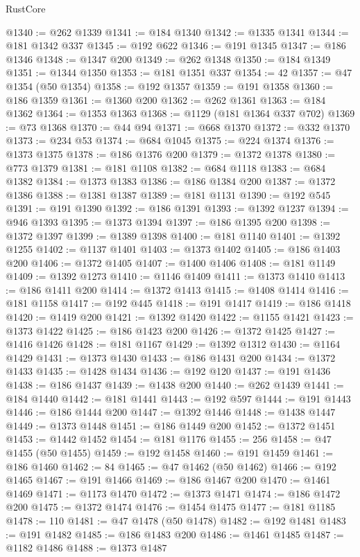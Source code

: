 \begin{lexlean}{RustCore}
\begin{coremodule}
@1340 := @262 @1339
@1341 := @184 @1340
@1342 := @1335 @1341
@1344 := @181 @1342 @337
@1345 := @192 @622
@1346 := @191 @1345
@1347 := @186 @1346
@1348 := @1347 @200
@1349 := @262 @1348
@1350 := @184 @1349
@1351 := @1344 @1350
@1353 := @181 @1351 @337
@1354 := 42
@1357 := @47 @1354 (@50 @1354)
@1358 := @192 @1357
@1359 := @191 @1358
@1360 := @186 @1359
@1361 := @1360 @200
@1362 := @262 @1361
@1363 := @184 @1362
@1364 := @1353 @1363
@1368 := @1129 (@181 @1364 @337 @702)
@1369 := @73 @1368
@1370 := @44 @94
@1371 := @668 @1370
@1372 := @332 @1370
@1373 := @234 @53
@1374 := @684 @1045
@1375 := @224 @1374
@1376 := @1373 @1375
@1378 := @186 @1376 @200
@1379 := @1372 @1378
@1380 := @773 @1379
@1381 := @181 @1108
@1382 := @684 @1118
@1383 := @684 @1382
@1384 := @1373 @1383
@1386 := @186 @1384 @200
@1387 := @1372 @1386
@1388 := @1381 @1387
@1389 := @181 @1131
@1390 := @192 @545
@1391 := @191 @1390
@1392 := @186 @1391
@1393 := @1392 @1237
@1394 := @946 @1393
@1395 := @1373 @1394
@1397 := @186 @1395 @200
@1398 := @1372 @1397
@1399 := @1389 @1398
@1400 := @181 @1140
@1401 := @1392 @1255
@1402 := @1137 @1401
@1403 := @1373 @1402
@1405 := @186 @1403 @200
@1406 := @1372 @1405
@1407 := @1400 @1406
@1408 := @181 @1149
@1409 := @1392 @1273
@1410 := @1146 @1409
@1411 := @1373 @1410
@1413 := @186 @1411 @200
@1414 := @1372 @1413
@1415 := @1408 @1414
@1416 := @181 @1158
@1417 := @192 @445
@1418 := @191 @1417
@1419 := @186 @1418
@1420 := @1419 @200
@1421 := @1392 @1420
@1422 := @1155 @1421
@1423 := @1373 @1422
@1425 := @186 @1423 @200
@1426 := @1372 @1425
@1427 := @1416 @1426
@1428 := @181 @1167
@1429 := @1392 @1312
@1430 := @1164 @1429
@1431 := @1373 @1430
@1433 := @186 @1431 @200
@1434 := @1372 @1433
@1435 := @1428 @1434
@1436 := @192 @120
@1437 := @191 @1436
@1438 := @186 @1437
@1439 := @1438 @200
@1440 := @262 @1439
@1441 := @184 @1440
@1442 := @181 @1441
@1443 := @192 @597
@1444 := @191 @1443
@1446 := @186 @1444 @200
@1447 := @1392 @1446
@1448 := @1438 @1447
@1449 := @1373 @1448
@1451 := @186 @1449 @200
@1452 := @1372 @1451
@1453 := @1442 @1452
@1454 := @181 @1176
@1455 := 256
@1458 := @47 @1455 (@50 @1455)
@1459 := @192 @1458
@1460 := @191 @1459
@1461 := @186 @1460
@1462 := 84
@1465 := @47 @1462 (@50 @1462)
@1466 := @192 @1465
@1467 := @191 @1466
@1469 := @186 @1467 @200
@1470 := @1461 @1469
@1471 := @1173 @1470
@1472 := @1373 @1471
@1474 := @186 @1472 @200
@1475 := @1372 @1474
@1476 := @1454 @1475
@1477 := @181 @1185
@1478 := 110
@1481 := @47 @1478 (@50 @1478)
@1482 := @192 @1481
@1483 := @191 @1482
@1485 := @186 @1483 @200
@1486 := @1461 @1485
@1487 := @1182 @1486
@1488 := @1373 @1487

\end{coremodule}
\end{lexlean}
